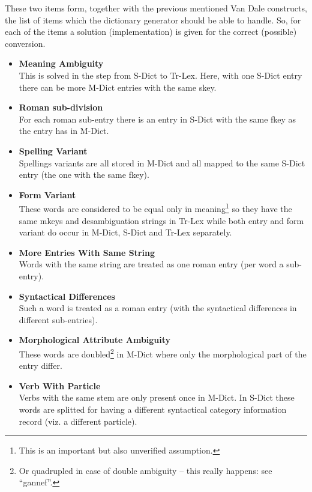 These two items form, together with the previous mentioned Van Dale constructs,
the list of items which the dictionary generator should be able to handle. So, 
for each of the items a solution (implementation) is given for the correct 
(possible) conversion. 

\begin{itemize}
  \item {\bf Meaning Ambiguity}\\
        This is solved in the step from S-Dict to Tr-Lex. Here, with one S-Dict
        entry there can be more M-Dict entries with the same skey.
  \item {\bf Roman sub-division}\\
        For each roman sub-entry there is an entry in S-Dict with the same fkey
        as the entry has in M-Dict.
  \item {\bf Spelling Variant}\\
        Spellings variants are all stored in M-Dict and all mapped to the same
        S-Dict entry (the one with the same fkey).
  \item {\bf Form Variant}\\
        These words are considered to be equal only in meaning\footnote{This
        is an important but also unverified assumption.} so they have the 
        same mkeys and desambiguation strings in Tr-Lex while both entry and 
        form variant do occur in M-Dict, S-Dict and Tr-Lex separately.
  \item {\bf More Entries With Same String}\\
        Words with the same string are treated as one roman entry (per word
        a sub-entry).
  \item {\bf Syntactical Differences}\\
        Such a word is treated as a roman entry (with the syntactical 
        differences in different sub-entries).
  \item {\bf Morphological Attribute Ambiguity}\\
        These words are doubled\footnote{Or quadrupled in case of double 
        ambiguity -- this really happens: see ``gannef''.} in M-Dict where only 
        the morphological part of the entry differ.
  \item {\bf Verb With Particle}\\
        Verbs with the same stem are only present once in M-Dict. In S-Dict 
        these words are splitted for having a different syntactical category 
        information record (viz. a different particle). 
\end{itemize}

